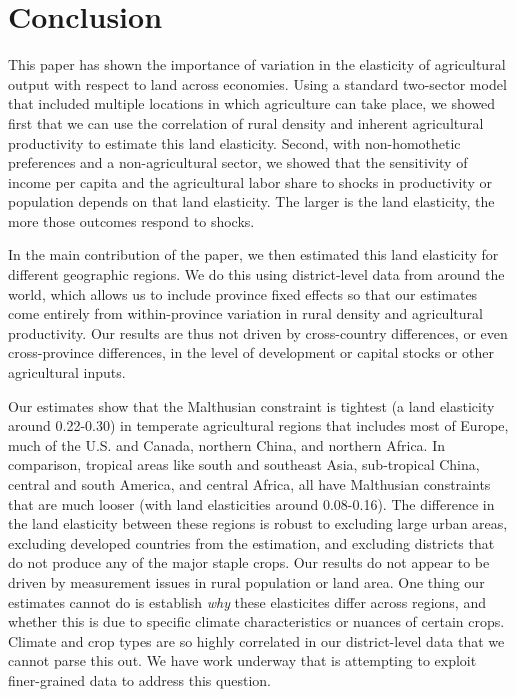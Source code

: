 \documentclass[11pt]{article}
\begin{document}
\section{Conclusion}
This paper has shown the importance of variation in the elasticity of agricultural output with respect to land across economies. Using a standard two-sector model that included multiple locations in which agriculture can take place, we showed first that we can use the correlation of rural density and inherent agricultural productivity to estimate this land elasticity. Second, with non-homothetic preferences and a non-agricultural sector, we showed that the sensitivity of income per capita and the agricultural labor share to shocks in productivity or population depends on that land elasticity. The larger is the land elasticity, the more those outcomes respond to shocks. 

In the main contribution of the paper, we then estimated this land elasticity for different geographic regions. We do this using district-level data from around the world, which allows us to include province fixed effects so that our estimates come entirely from within-province variation in rural density and agricultural productivity. Our results are thus not driven by cross-country differences, or even cross-province differences, in the level of development or capital stocks or other agricultural inputs. 

Our estimates show that the Malthusian constraint is tightest (a land elasticity around 0.22-0.30) in temperate agricultural regions that includes most of Europe, much of the U.S. and Canada, northern China, and northern Africa. In comparison, tropical areas like south and southeast Asia, sub-tropical China, central and south America, and central Africa, all have Malthusian constraints that are much looser (with land elasticities around 0.08-0.16). The difference in the land elasticity between these regions is robust to excluding large urban areas, excluding developed countries from the estimation, and excluding districts that do not produce any of the major staple crops. Our results do not appear to be driven by measurement issues in rural population or land area. One thing our estimates cannot do is establish \textit{why} these elasticites differ across regions, and whether this is due to specific climate characteristics or nuances of certain crops. Climate and crop types are so highly correlated in our district-level data that we cannot parse this out. We have work underway that is attempting to exploit finer-grained data to address this question.
\end{document}
